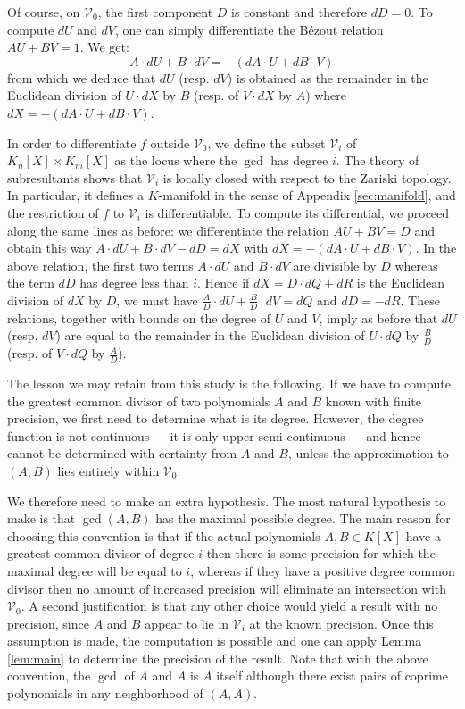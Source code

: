 \documentclass{sig-alternate}
\begin{document}
{Of course, on $\mathcal V_0$, the first component $D$ is constant and 
therefore $dD = 0$. To compute $dU$ and $dV$, one can simply 
differentiate the B\'ezout relation $AU + BV = 1$. We get:
$$A \cdot dU + B \cdot dV = - (dA \cdot U + dB \cdot V)$$
from which we deduce that $dU$ (resp. $dV$) is obtained as the 
remainder in the Euclidean division of $U{\cdot}dX$ by $B$ (resp. of 
$V{\cdot}dX$ by $A$) where $dX = - (dA \cdot U + dB \cdot V)$.

In order to differentiate $f$ outside $\mathcal V_0$, we 
define the subset $\mathcal V_i$ of $K_n[X] \times 
K_m[X]$ as the locus where the $\gcd$ has degree $i$. The theory of 
subresultants shows that $\mathcal V_i$ is locally closed with respect to 
the Zariski topology. In particular, it defines a $K$-manifold in the 
sense of Appendix \ref{sec:manifold}, and the 
restriction of $f$ to $\mathcal V_i$ is differentiable. To compute
its differential, we proceed along the same lines as before: we 
differentiate the relation $AU + BV = D$ and obtain this way
$A \cdot dU + B \cdot dV - dD = dX$
with $dX = - (dA \cdot U + dB \cdot V)$. In the above relation, the
first two terms $A{\cdot}dU$ and $B{\cdot}dV$ are divisible by $D$ 
whereas the term $dD$ has degree less than $i$. 
Hence if $dX = D \cdot dQ + dR$ is the Euclidean division of $dX$ by $D$, 
we must have $\frac A D \cdot dU + \frac B D \cdot dV = dQ$ and $dD = 
-dR$. These relations, together with bounds on the degree of $U$ and $V$,
imply as before that $dU$ (resp. $dV$) are equal to the remainder in the
Euclidean division of $U{\cdot}dQ$ by $\frac B D$ (resp. of $V{\cdot}dQ$
by $\frac A D$).

\medskip

The lesson we may retain from this study is the following. If we have to 
compute the greatest common divisor of two polynomials $A$ and $B$ known 
with finite precision, we first need to determine what is its degree. 
However, the degree function is not continuous --- it is only upper 
semi-continuous --- and hence cannot be determined with certainty from $A$ and 
$B$, unless the approximation to $(A,B)$ lies entirely within $\mathcal V_0$.

We therefore need to make an extra hypothesis.  The most natural hypothesis to make
is that $\gcd(A, B)$ has the maximal possible degree.  The main reason for choosing
this convention is that if the actual polynomials $A, B \in K[X]$ have a greatest common
divisor of degree $i$ then there is some precision for which the maximal degree will be
equal to $i$, whereas if they have a positive
degree common divisor then no amount of increased precision will eliminate an intersection
with $\mathcal V_0$.  A second justification is that any other choice would yield a result
with no precision, since $A$ and $B$ appear to lie in $\mathcal V_i$ at the known precision.
Once this assumption is made, the computation is possible and one can apply Lemma 
\ref{lem:main} to determine the precision of the result.
Note that with the above convention, the $\gcd$ of $A$ and $A$ is $A$ 
itself although there exist pairs of coprime polynomials in any 
neighborhood of $(A,A)$.

}
\end{document}
